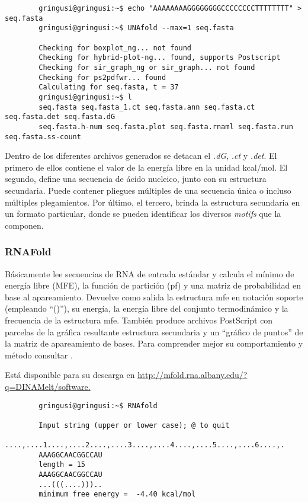 {\scriptsize
	\begin{verbatim}
        gringusi@gringusi:~$ echo "AAAAAAAAGGGGGGGGCCCCCCCCTTTTTTTT" > seq.fasta
        gringusi@gringusi:~$ UNAfold --max=1 seq.fasta

        Checking for boxplot_ng... not found
        Checking for hybrid-plot-ng... found, supports Postscript
        Checking for sir_graph_ng or sir_graph... not found
        Checking for ps2pdfwr... found
        Calculating for seq.fasta, t = 37
        gringusi@gringusi:~$ l
        seq.fasta seq.fasta_1.ct seq.fasta.ann seq.fasta.ct seq.fasta.det seq.fasta.dG 
        seq.fasta.h-num seq.fasta.plot seq.fasta.rnaml seq.fasta.run seq.fasta.ss-count
    \end{verbatim}
}

Dentro de los diferentes archivos generados se detacan el \emph{.dG}, \emph{.ct} y \emph{.det}. El primero de ellos contiene el valor de la energía libre en la unidad kcal/mol. El segundo,  define una secuencia de ácido nucleico, junto con su estructura secundaria. Puede contener pliegues múltiples de una secuencia única o incluso múltiples plegamientos. Por último, el tercero, brinda la estructura secundaria en un formato particular, donde se pueden identificar los diversos \emph{motifs} que la componen.

\subsubsection{RNAFold}
\label{rnafold}
\par Básicamente lee secuencias de RNA de entrada estándar y calcula el mínimo de energía libre (MFE), la función de partición (pf) y una matriz de probabilidad en base al apareamiento. Devuelve como salida la estructura mfe en notación soporte (empleando ``()''), su energía, la energía libre del conjunto termodinámico y la frecuencia de la estructura mfe. También produce archivos PostScript con parcelas de la gráfica resultante estructura secundaria y un ``gráfico de puntos'' de la matriz de apareamiento de bases. Para comprender mejor su comportamiento y método consultar \cite{vienna}.

\par Está disponible para su descarga en \url{http://mfold.rna.albany.edu/?q=DINAMelt/software.}

{\scriptsize
	\begin{verbatim}
        gringusi@gringusi:~$ RNAfold

        Input string (upper or lower case); @ to quit
        ....,....1....,....2....,....3....,....4....,....5....,....6....,.
        AAAGGCAACGGCCAU
        length = 15
        AAAGGCAACGGCCAU
        ...(((....))).. 
        minimum free energy =  -4.40 kcal/mol
	\end{verbatim}
}

